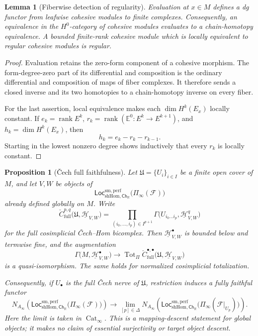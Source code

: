 \documentclass[12pt]{amsart}
\newtheorem{lem}[thm]{Lemma}
\newtheorem{prop}[thm]{Proposition}
\theoremstyle{definition}
\theoremstyle{remark}
\numberwithin{equation}{section}
\newcommand{\CF}{{\mathcal F}}
\newcommand{\R}{{\mathbb{R}}}
\newcommand{\1}{{\mathbb{1}}}
\newcommand{\Ch}{\mathsf{Ch}}
\newcommand{\Loc}{\mathsf{Loc}}
\begin{document}
\begin{lem}[Fiberwise detection of regularity]
\label{lem:fiberwise-regularity}
Evaluation at $x\in M$ defines a dg functor from leafwise cohesive
modules to finite complexes.  Consequently, an equivalence in the
$H^0$-category of cohesive modules evaluates to a chain-homotopy
equivalence.  A bounded finite-rank cohesive module which is locally
equivalent to regular cohesive modules is regular.
\end{lem}

\begin{proof}
Evaluation retains the zero-form component of a cohesive morphism.
The form-degree-zero part of its differential and composition is the
ordinary differential and composition of maps of fiber complexes.
It therefore sends a closed inverse and its two homotopies to a
chain-homotopy inverse on every fiber.

For the last assertion, local equivalence makes each
$\dim H^k(E_x)$ locally constant.  If
$e_k=\operatorname{rank} E^k$,
$r_k=\operatorname{rank}(\mathbb E^0:E^k\to E^{k+1})$, and
$h_k=\dim H^k(E_x)$, then
\[
 h_k=e_k-r_k-r_{k-1}.
\]
Starting in the lowest nonzero degree shows inductively that every
$r_k$ is locally constant.
\end{proof}

\begin{prop}[\v{C}ech full faithfulness]
\label{prop:shhom-cech-full-faithfulness}
Let $\mathfrak U=\{U_i\}_{i\in I}$ be a finite open cover of $M$,
and let $V,W$ be objects of
\[
 \Loc_{\mathrm{shHom},\Ch_{\R}}^{\mathrm{sm,perf}}
 \bigl(\Pi_\infty(\CF)\bigr)
\]
already defined globally on $M$.  Write
\[
 \check C_{\mathrm{full}}^{p,q}
 \bigl(\mathfrak U,\underline{\mathcal H}_{V,W}\bigr)
 =
 \prod_{(i_0,\ldots,i_p)\in I^{p+1}}
 \Gamma\bigl(
 U_{i_0\ldots i_p},
 \underline{\mathcal H}_{V,W}^{q}
 \bigr)
\]
for the full cosimplicial \v{C}ech--Hom bicomplex.  Then
$\underline{\mathcal H}_{V,W}^{\bullet}$ is bounded below and
termwise fine, and the augmentation
\[
 \Gamma\bigl(M,\underline{\mathcal H}_{V,W}^{\bullet}\bigr)
 \longrightarrow
 \operatorname{Tot}_{\Pi}
 \check C_{\mathrm{full}}^{\bullet,\bullet}
 \bigl(\mathfrak U,\underline{\mathcal H}_{V,W}\bigr)
\]
is a quasi-isomorphism.  The same holds for normalized cosimplicial
totalization.

Consequently, if $U_\bullet$ is the full \v{C}ech nerve of
$\mathfrak U$, restriction induces a fully faithful functor
\[
 N_{A_\infty}\left(
 \Loc_{\mathrm{shHom},\Ch_{\R}}^{\mathrm{sm,perf}}
 \bigl(\Pi_\infty(\CF)\bigr)\right)
 \longrightarrow
 \lim_{[p]\in\Delta}
 N_{A_\infty}\left(
 \Loc_{\mathrm{shHom},\Ch_{\R}}^{\mathrm{sm,perf}}
 \bigl(\Pi_\infty(\CF|_{U_p})\bigr)\right).
\]
Here the limit is taken in $\operatorname{Cat}_\infty$.
This is a mapping-descent statement for global objects; it makes no
claim of essential surjectivity or target object descent.
\end{prop}
\end{document}
